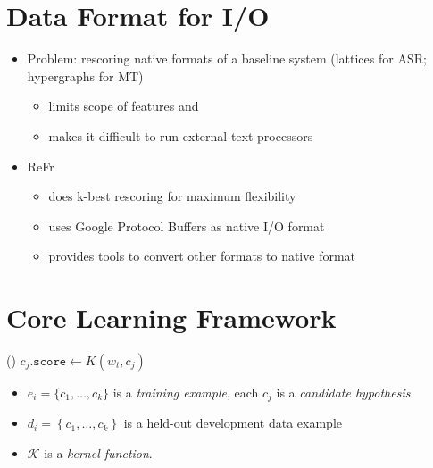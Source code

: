 \documentclass[noback,portrait,twocolumn]{cuposter}
\begin{document}
\section{Data Format for I/O}
\begin{itemize}
\item Problem: rescoring native formats of a baseline system (lattices
  for ASR; hypergraphs for MT)
  \begin{itemize}
    \item limits scope of features and
    \item makes it difficult to run external text processors
  \end{itemize}
\item ReFr
  \begin{itemize}
  \item does k-best rescoring for maximum flexibility
  \item uses Google Protocol Buffers \cite{protobuf} as native I/O format
  \item provides tools to convert other formats to native format
  \end{itemize}
\end{itemize}

\nobreak
\section{Core Learning Framework}
\begin{minipage}[t]{23.5cm}{
\renewcommand\algorithmicforall{\textbf{foreach}}
\begin{algorithmic}
    \State {}
    \State {}
  \EndWhile
\EndProcedure
\State
{}
    \State {}
      \State {}()
    \EndIf
  \EndFor
\EndProcedure
\State
{}
    \State $c_j.\texttt{score} \leftarrow K(w_t, c_j)$
  \EndFor
\EndProcedure
\end{algorithmic}
}\end{minipage}
\begin{minipage}[t]{10cm}{
\vspace{1cm}
  \begin{itemize}
  \item $e_{i}=\{c_{1},\ldots,c_{k}\}$ is a \emph{training example},
        each $c_{j}$ is a \emph{candidate hypothesis}.
  \item $d_{i}=\left\{ c_{1},\ldots,c_{k}\right\} $ is a held-out development data        example
  \item $\mathcal{K}$ is a \emph{kernel function}.
  \end{itemize}
}\end{minipage}
\end{document}
